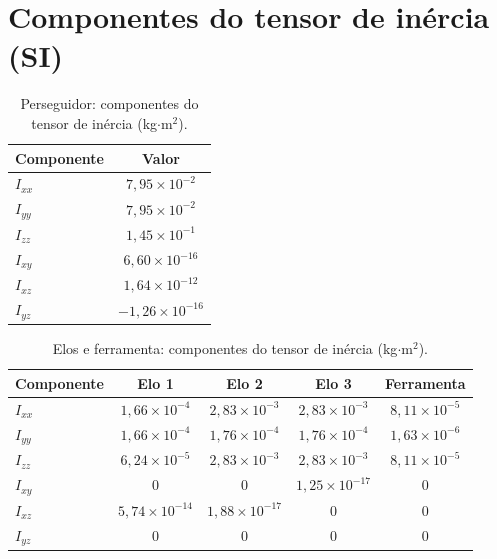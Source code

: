 
\section{Componentes do tensor de inércia (SI)}

\begin{table}[H]
\centering
\caption{Perseguidor: componentes do tensor de inércia (kg$\cdot$m$^2$).}
\label{tab_perseguidor_I_base_SI}
\begin{tabular}{lc}
\hline
\textbf{Componente} & \textbf{Valor} \\
\hline
$I_{xx}$ & $7,95\times 10^{-2}$ \\
$I_{yy}$ & $7,95\times 10^{-2}$ \\
$I_{zz}$ & $1,45\times 10^{-1}$ \\
$I_{xy}$ & $6,60\times 10^{-16}$ \\
$I_{xz}$ & $1,64\times 10^{-12}$ \\
$I_{yz}$ & $-1,26\times 10^{-16}$ \\
\hline
\end{tabular}
\end{table}


\begin{table}[H]
\centering
\caption{Elos e ferramenta: componentes do tensor de inércia (kg$\cdot$m$^2$).}
\label{tab_perseguidor_I_elos_SI}
\begin{tabular}{lcccc}
\hline
\textbf{Componente} & \textbf{Elo 1} & \textbf{Elo 2} & \textbf{Elo 3} & \textbf{Ferramenta} \\
\hline
$I_{xx}$ & $1,66\times 10^{-4}$ & $2,83\times 10^{-3}$ & $2,83\times 10^{-3}$ & $8,11\times 10^{-5}$ \\
$I_{yy}$ & $1,66\times 10^{-4}$ & $1,76\times 10^{-4}$ & $1,76\times 10^{-4}$ & $1,63\times 10^{-6}$ \\
$I_{zz}$ & $6,24\times 10^{-5}$ & $2,83\times 10^{-3}$ & $2,83\times 10^{-3}$ & $8,11\times 10^{-5}$ \\
$I_{xy}$ & $0$ & $0$ & $1,25\times 10^{-17}$ & $0$ \\
$I_{xz}$ & $5,74\times 10^{-14}$ & $1,88\times 10^{-17}$ & $0$ & $0$ \\
$I_{yz}$ & $0$ & $0$ & $0$ & $0$ \\
\hline
\end{tabular}
\end{table}

